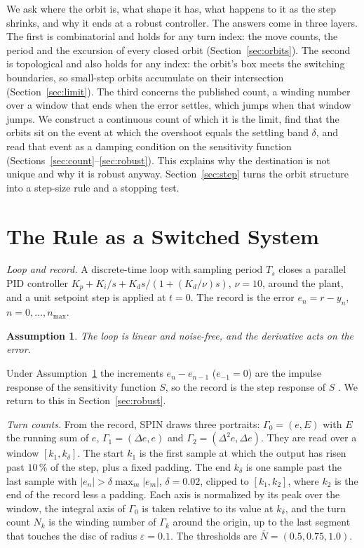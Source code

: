\documentclass[letterpaper, 10 pt, conference]{ieeeconf}
\newtheorem{assumption}{Assumption}
\newcommand{\Nbar}{\bar{N}}
\newcommand{\spin}{SPIN}
\begin{document}
We ask where the orbit is, what shape it has, what happens to it as the step
shrinks, and why it ends at a robust controller. The answers come in three
layers. The first is combinatorial and holds for any turn index: the move
counts, the period and the excursion of every closed orbit
(Section~\ref{sec:orbits}). The second is topological and also holds for any
index: the orbit's box meets the switching boundaries, so small-step orbits
accumulate on their intersection (Section~\ref{sec:limit}). The third
concerns the published count, a winding number over a window that ends when
the error settles, which jumps when that window jumps. We construct a
continuous count of which it is the limit, find that the orbits sit on the
event at which the overshoot equals the settling band $\delta$, and read that
event as
a damping condition on the sensitivity function
(Sections~\ref{sec:count}--\ref{sec:robust}). This explains why the
destination is not unique and why it is robust anyway.
Section~\ref{sec:step} turns the orbit structure into a step-size rule and a
stopping test.

\section{The Rule as a Switched System}
\label{sec:rule}

\emph{Loop and record.} A discrete-time loop with sampling period $T_s$
closes a parallel PID controller $K_p + K_i/s + K_d s/(1 + (K_d/\nu) s)$,
$\nu = 10$, around the plant, and a unit setpoint step is applied at
$t = 0$. The record is the error $e_n = r - y_n$, $n = 0, \dots, n_{\max}$.

\begin{assumption}\label{ass:loop}
The loop is linear and noise-free, and the derivative acts on the error.
\end{assumption}

Under Assumption~\ref{ass:loop} the increments $e_n - e_{n-1}$ ($e_{-1} = 0$)
are the impulse response of the sensitivity function $S$, so the record is
the step response of $S$ \cite{Certified}. We return to this in
Section~\ref{sec:robust}.

\emph{Turn counts.} From the record, \spin{} draws three portraits:
$\Gamma_0 = (e, E)$ with $E$ the running sum of $e$, $\Gamma_1 = (\Delta e, e)$
and $\Gamma_2 = (\Delta^2 e, \Delta e)$. They are read over a window
$[k_1, k_\delta]$. The start $k_1$ is the first sample at which the output
has risen past $10\,\%$ of the step, plus a fixed padding. The end $k_\delta$
is one sample past the last sample with $|e_n| > \delta \max_m |e_m|$,
$\delta = 0.02$, clipped to $[k_1, k_2]$, where $k_2$ is the end of the record
less a padding. Each axis is normalized by its peak over the window, the
integral axis of $\Gamma_0$ is taken relative to its value at $k_\delta$, and the
turn count $N_k$ is the winding number of $\Gamma_k$ around the origin, up to
the last segment that touches the disc of radius $\varepsilon = 0.1$. The
thresholds are $\Nbar = (0.5, 0.75, 1.0)$.
\end{document}
